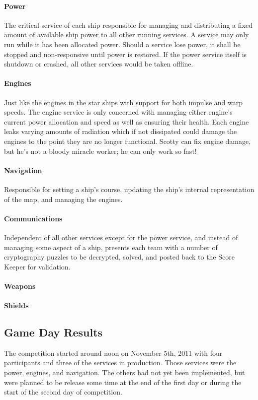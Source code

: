 \documentclass[10pt]{article}
\begin{document}
\paragraph*{Power} The critical service of each ship responsible for managing
and distributing a fixed amount of available ship power to all other running
services. A service may only run while it has been allocated power. Should a
service lose power, it shall be stopped and non-responsive until power is
restored. If the power service itself is shutdown or crashed, all other
services would be taken offline.

\paragraph*{Engines} Just like the engines in the star ships with support for
both impulse and warp speeds. The engine service is only concerned with
managing either engine's current power allocation and speed as well as ensuring
their health. Each engine leaks varying amounts of radiation which if not
dissipated could damage the engines to the point they are no longer functional.
Scotty can fix engine damage, but he's not a bloody miracle worker; he can only
work so fast!

\paragraph*{Navigation} Responsible for setting a ship's course, updating the
ship's internal representation of the map, and managing the engines.

\paragraph*{Communications} Independent of all other services except for the
power service, and instead of managing some aspect of a ship, presents each team
with a number of cryptography puzzles to be decrypted, solved, and posted back
to the Score Keeper for validation.

\paragraph*{Weapons}

\paragraph*{Shields}

\subsection{Game Day Results}
The competition started around noon on November 5th, 2011 with four participants
and three of the services in production. Those services were the power, engines,
and navigation. The others had not yet been implemented, but were
planned to be release some time at the end of the first day or during the start
of the second day of competition.
\end{document}
